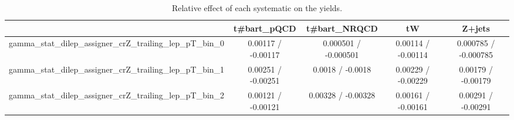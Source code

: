 \documentclass[10pt]{article}
\begin{document}
\begin{table}[htbp]
\begin{center}
\begin{tabular}{|c|c|c|c|c|}
\hline 
      & t#bar{t}_{pQCD}      & t#bar{t}_{NRQCD}      & tW      & Z+jets \\ 
\hline 
  gamma_stat_dilep_assigner_crZ_trailing_lep_pT_bin_0 & 0.00117 / -0.00117 & 0.000501 / -0.000501 & 0.00114 / -0.00114 & 0.000785 / -0.000785 \\ 
  gamma_stat_dilep_assigner_crZ_trailing_lep_pT_bin_1 & 0.00251 / -0.00251 & 0.0018 / -0.0018 & 0.00229 / -0.00229 & 0.00179 / -0.00179 \\ 
  gamma_stat_dilep_assigner_crZ_trailing_lep_pT_bin_2 & 0.00121 / -0.00121 & 0.00328 / -0.00328 & 0.00161 / -0.00161 & 0.00291 / -0.00291 \\ 
\hline 
\end{tabular} 
\caption{Relative effect of each systematic on the yields.} 
\end{center} 
\end{table} 
\end{document}
